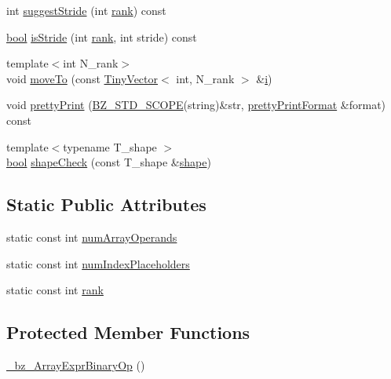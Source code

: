 \begin{DoxyCompactItemize}
int \hyperlink{class__bz__ArrayExprBinaryOp_a2ef2843b1ad46e455426fc150040ec7f}{suggest\+Stride} (int \hyperlink{class__bz__ArrayExprBinaryOp_a21b807f5de687f033836d8a82bae7f10}{rank}) const 
\item 
\hyperlink{compiler_8h_abb452686968e48b67397da5f97445f5b}{bool} \hyperlink{class__bz__ArrayExprBinaryOp_a49e995c1e4ae8de27714220f4d9befe4}{is\+Stride} (int \hyperlink{class__bz__ArrayExprBinaryOp_a21b807f5de687f033836d8a82bae7f10}{rank}, int stride) const 
\item 
{\footnotesize template$<$int N\+\_\+rank$>$ }\\void \hyperlink{class__bz__ArrayExprBinaryOp_ad8081c744d90c33b16cf27933b072b61}{move\+To} (const \hyperlink{classTinyVector}{Tiny\+Vector}$<$ int, N\+\_\+rank $>$ \&\hyperlink{indexexpr_8h_aabd77643995707c185e95c8cb2782c81}{i})
\item 
void \hyperlink{class__bz__ArrayExprBinaryOp_a46529dff39fb4aae57bb07c691270695}{pretty\+Print} (\hyperlink{numinquire_8h_a2b24ffc3b4ef9803956bc7715c6c7b83}{B\+Z\+\_\+\+S\+T\+D\+\_\+\+S\+C\+O\+P\+E}(string)\&str, \hyperlink{classprettyPrintFormat}{pretty\+Print\+Format} \&format) const 
\item 
{\footnotesize template$<$typename T\+\_\+shape $>$ }\\\hyperlink{compiler_8h_abb452686968e48b67397da5f97445f5b}{bool} \hyperlink{class__bz__ArrayExprBinaryOp_a20121160090b99163ab2e9716b9750a2}{shape\+Check} (const T\+\_\+shape \&\hyperlink{shape_8h_a9d9da3dcaecbbde6cf1961063f2e838b}{shape})
\end{DoxyCompactItemize}
\subsection*{Static Public Attributes}
\begin{DoxyCompactItemize}
\item 
static const int \hyperlink{class__bz__ArrayExprBinaryOp_acc12dce488dac94b1e25e7672d556cae}{num\+Array\+Operands}
\item 
static const int \hyperlink{class__bz__ArrayExprBinaryOp_ae2270092c60ff26deb5574340a73cea1}{num\+Index\+Placeholders}
\item 
static const int \hyperlink{class__bz__ArrayExprBinaryOp_a21b807f5de687f033836d8a82bae7f10}{rank}
\end{DoxyCompactItemize}
\subsection*{Protected Member Functions}
\begin{DoxyCompactItemize}
\item 
\hyperlink{class__bz__ArrayExprBinaryOp_ac1b235833fe3d2580b102b0b2e07740c}{\+\_\+bz\+\_\+\+Array\+Expr\+Binary\+Op} ()
\end{DoxyCompactItemize}
